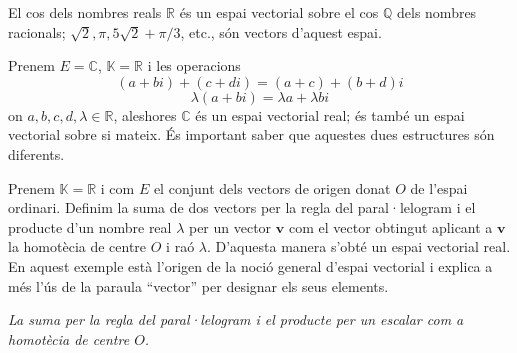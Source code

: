 \begin{exemple}
El cos dels nombres reals $\mathbb{R}$ és un espai vectorial
sobre el cos $\mathbb{Q}$ dels nombres racionals; $\sqrt{2},\pi ,5%
\sqrt{2}+\pi /3$, etc., són vectors d’aquest espai.
\end{exemple}

\begin{exemple}
Prenem $E=\mathbb{C}$, $\mathbb{K}=\mathbb{R}$ i les operacions%
\begin{equation*}
(a+bi)+(c+di)=(a+c)+(b+d)i
\end{equation*}%
\begin{equation*}
\lambda (a+bi)=\lambda a+\lambda bi
\end{equation*}%
on $a,b,c,d,\lambda \in \mathbb{R}$, aleshores $\mathbb{C}$ és un espai
vectorial real; és també un espai vectorial sobre si mateix. És important saber que aquestes dues estructures són diferents.
\end{exemple}

\begin{exemple}
Prenem $\mathbb{K}=\mathbb{R}$ i com $E$ el conjunt dels vectors de
origen donat $O$ de l’espai ordinari. Definim la suma de dos vectors per
la regla del paral·lelogram i el producte d’un nombre real $\lambda $
per un vector $\mathbf{v}$ com el vector obtingut aplicant a $\mathbf{v}$
la homotècia de centre $O$ i raó $\lambda $. D’aquesta manera s’obté
un espai vectorial real. En aquest exemple està l’origen de la noció general d’espai vectorial i explica a més l'ús de la paraula
``vector'' per designar els seus elements.
\end{exemple}

\begin{center}
%

{\small\itshape La suma per la regla del paral·lelogram i el producte per un escalar com a homotècia de centre $O$.}
\end{center}

